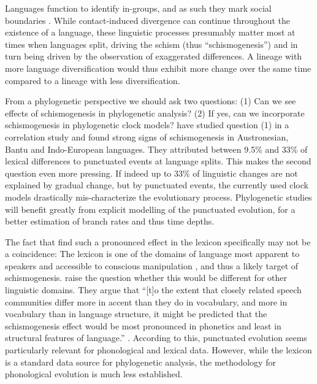 \documentclass[]{rsos}%
\begin{document}
Languages function to identify in-groups, and as such they mark social
boundaries \parencite{labov1963social,epps2020amazonian}.
While contact-induced divergence \parencite{evans2019linguistic} can continue
throughout the existence of a language, these linguistic processes presumably
matter most at times when languages split, driving the schism (thus
“schismogenesis”) and in turn being driven by the observation of exaggerated
differences. A lineage with more language diversification would thus exhibit 
more change over the same time compared to a lineage with less diversification.

From a phylogenetic perspective we should ask two questions:
(1) Can we see effects of schismogenesis in phylogenetic analysis?
(2) If yes, can we incorporate schismogenesis in phylogenetic clock models?
\textcite{atkinson2008languages} have studied question (1) in a correlation study and found strong signs of schismogenesis in Austronesian, Bantu and Indo-European languages. They attributed between 9.5\% and 33\% of lexical differences to punctuated events at language splits.
This makes the second question even more pressing. If indeed up to 33\% of linguistic changes are not explained by gradual change, but by punctuated events, the currently used clock models drastically mis-characterize the evolutionary process. Phylogenetic studies will benefit
greatly from explicit modelling of the punctuated evolution, for a better
estimation of branch rates and thus time depths.

The fact that \textcite{atkinson2008languages} find such a pronounced effect in the lexicon specifically may not be a coincidence:
The lexicon is one of the domains
of language most apparent to speakers and accessible to conscious manipulation
\parencite[see][for an extensive discussion]{thomason2007language}, and thus a
likely target of schismogenesis.
\Textcite{gray2013three} raise the question whether this would be different for
other linguistic domains. They argue that “[t]o the extent that closely related
speech communities differ more in accent than they do in vocabulary, and more in
vocabulary than in language structure, it might be predicted that the
schismogenesis effect would be most pronounced in phonetics and least in
structural features of language.” \parencite[p. 295]{gray2013three}.
According to this, punctuated evolution seems particularly relevant for phonological and lexical data. However, while the lexicon is a standard data source for phylogenetic analysis, the methodology for phonological evolution is much less established.
\end{document}
